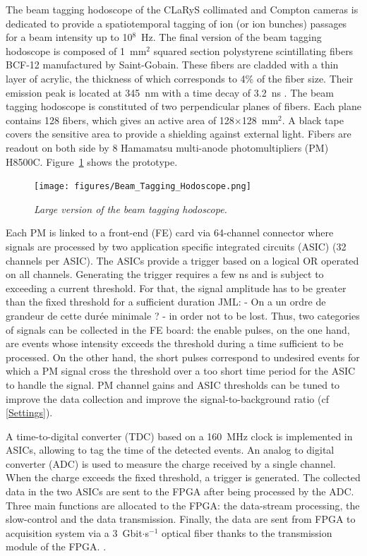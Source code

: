 \documentclass[a4paper,11pt]{article}
\newcommand\jml[1]{\color{jmlcolor}JML: - #1 - \color{black}}
\begin{document}
The beam tagging hodoscope of the CLaRyS collimated and Compton cameras is dedicated to provide a spatiotemporal tagging of ion (or ion bunches) passages for a beam intensity up to 10$^{8}$~Hz.
The final version of the beam tagging hodoscope is composed  of 1~mm$^{2}$ squared section polystyrene scintillating fibers BCF-12 manufactured by Saint-Gobain. These fibers are cladded with a thin layer of acrylic, the thickness of which corresponds to 4\% of the fiber size. Their emission peak is located at 345~nm with a time decay of 3.2~ns \cite{SaintGobain2017}.
The beam tagging hodoscope is constituted of two perpendicular planes of fibers. Each plane contains 128 fibers, which gives an active area of 128$\times$128~mm$^{2}$. A black tape covers the sensitive area to provide a shielding against external light. Fibers are readout on both side by 8 Hamamatsu multi-anode photomultipliers (PM) H8500C. Figure~\ref{fig:hodoscope} shows the prototype.

\begin{figure}[htb]
\centering
\texttt{[image: figures/Beam\_Tagging\_Hodoscope.png]}
\caption{\small{\textit{Large version of the beam tagging hodoscope.}}}
\label{fig:hodoscope}
\end{figure}

Each PM is linked to a front-end (FE) card via 64-channel connector where signals are processed by two application specific integrated circuits (ASIC) (32 channels per ASIC). The ASICs provide a trigger based on a logical OR operated on all channels. Generating the trigger requires a few ns and is subject to exceeding a current threshold. For that, the signal amplitude has to be greater than the fixed threshold for a sufficient duration \jml{On a un ordre de grandeur de cette durée minimale ?} in order not to be lost. Thus, two categories of signals can be collected in the FE board: the enable pulses, on the one hand, are events whose intensity exceeds the threshold during a time sufficient to be processed. On the other hand, the short pulses correspond to undesired events for which a PM signal cross the threshold over a too short time period for the ASIC to handle the signal. PM channel gains and ASIC thresholds can be tuned to improve the data collection and improve the signal-to-background ratio (cf \ref{Settings}).

A time-to-digital converter (TDC) based on a 160~MHz clock is implemented in ASICs, allowing to tag the time of the detected events. An analog to digital converter (ADC) is used to measure the charge received by a single channel. When the charge exceeds the fixed threshold, a trigger is generated. The collected data in the two ASICs are sent to the FPGA after being processed by the ADC. Three main functions are allocated to the FPGA: the data-stream processing, the slow-control and the data transmission. Finally, the data are sent from FPGA to acquisition system via a 3~Gbit$\cdot$s$^{-1}$ optical fiber thanks to the transmission module of the FPGA. \cite{deng2013, Chen2017, Chen2019}.
\end{document}
